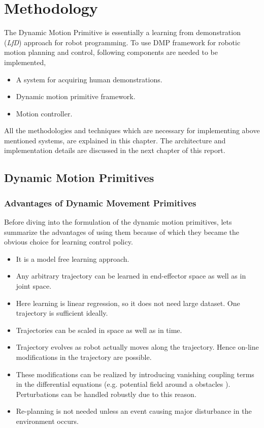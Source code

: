 \chapter{Methodology}

The Dynamic Motion Primitive is essentially a learning from demonstration (\textit{LfD}) approach for robot programming. To use DMP framework for robotic motion planning and control, following components are needed to be implemented, 

\begin{itemize}
	\item A system for acquiring human demonstrations.
	\item Dynamic motion primitive framework.
	\item Motion controller.
\end{itemize} 

All the methodologies and techniques which are necessary for implementing above mentioned systems, are explained in this chapter. The architecture and implementation details are discussed in the next chapter of this report. 

\section{Dynamic Motion Primitives}

\subsection{Advantages of Dynamic Movement Primitives}
Before diving into the formulation of the dynamic motion primitives, lets summarize the advantages of using them because of which they became the obvious choice for learning control policy.  
\begin{itemize}
	\item It is a model free learning approach.
	\item Any arbitrary trajectory can be learned in end-effector space as well as in joint space.
	\item Here learning is linear regression, so it does not need large dataset.
	One trajectory is sufficient ideally.
	\item Trajectories can be scaled in space as well as in time.
	\item Trajectory evolves as robot actually moves along the trajectory. Hence on-line modifications in the trajectory are possible.
	\item These modifications can be realized by introducing vanishing coupling terms in the differential equations (e.g. potential field around a obstacles \cite{park2008movement}). Perturbations can be handled robustly due to this reason.
	\item Re-planning is not needed unless an event causing major disturbance in the environment occurs.
\end{itemize}

